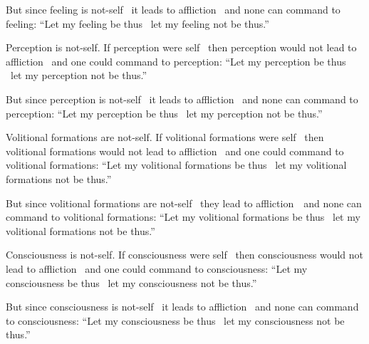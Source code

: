\begin{english-only-hangtogether}
  But since feeling is not-self \breathmark\ it leads to affliction \breathmark\ and none can command to feeling: ``Let my feeling be thus \breathmark\ let my feeling not be thus.''
\end{english-only-hangtogether}

\begin{english-only-hang}
  Perception is not-self. If perception were self \breathmark\ then perception would not lead to affliction \breathmark\ and one could command to perception: ``Let my perception be thus \breathmark\ let my perception not be thus.''
\end{english-only-hang}

\begin{english-only-hangtogether}
  But since perception is not-self \breathmark\ it leads to affliction \breathmark\ and none can command to perception: ``Let my perception be thus \breathmark\ let my perception not be thus.''
\end{english-only-hangtogether}

\begin{english-only-hang}
  Volitional formations are not-self. If volitional formations were self \breathmark\ then volitional formations would not lead to affliction \breathmark\ and one could command to volitional formations: ``Let my volitional formations be thus \breathmark\ let my volitional formations not be thus.''
\end{english-only-hang}

\begin{english-only-hangtogether}
  But since volitional formations are not-self \breathmark\ they lead to \mbox{affliction}~\breathmark\ and none can command to volitional formations: ``Let my volitional formations be thus \breathmark\ let my volitional formations not be thus.''
\end{english-only-hangtogether}

\begin{english-only-hang}
  Consciousness is not-self. If consciousness were self \breathmark\ then consciousness would not lead to affliction \breathmark\ and one could command to consciousness: ``Let my consciousness be thus \breathmark\ let my consciousness not be thus.''
\end{english-only-hang}

\begin{english-only-hangtogether}
  But since consciousness is not-self \breathmark\ it leads to affliction \breathmark\ and none can command to consciousness: ``Let my consciousness be thus \breathmark\ let my consciousness not be thus.''
\end{english-only-hangtogether}

